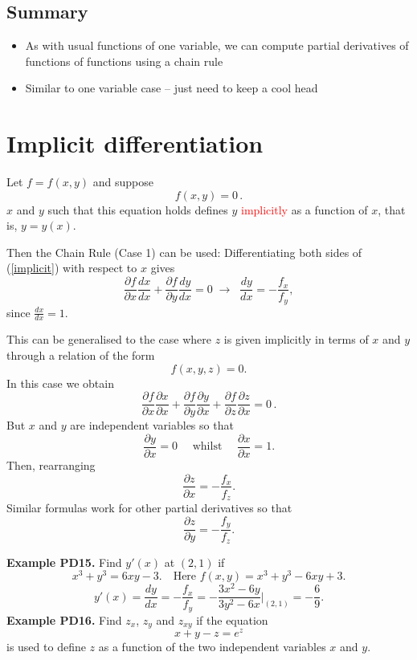 \documentclass{article}
\begin{document}
\subsection{Summary}

\begin{itemize}
\item
As with usual functions of one variable, we can compute partial derivatives of functions of functions using a chain rule
\item
Similar to one variable case -- just need to keep a cool head
\end{itemize}


\section{Implicit differentiation}

Let $f=f(x,y)$ and suppose
\begin{equation}
\label{implicit}
f(x,y)=0\,.
\end{equation}
$x$ and $y$ such that this equation holds defines $y$ \textcolor{red}{implicitly} as a function of $x$, that is, $y=y(x)$.

Then the Chain Rule (Case 1) can be used: Differentiating both sides of (\ref{implicit}) 
with respect to $x$ gives
$$
 \frac{\partial f}{\partial x} \frac{d x}{d x}
+ \frac{\partial f}{\partial y} \frac{d y}{d x}=0 \; \to \;\;
\frac{dy}{dx} = - \frac{f_x}{f_y},
$$
since $\frac{dx}{dx}=1$. 


This can be generalised to the case where $z$ is given implicitly in terms of $x$ and $y$ through a relation of the form 
$$
f(x,y,z)=0.
$$
In this case we obtain
$$
 \frac{\partial f}{\partial x} \frac{\partial x}{\partial x}
+ \frac{\partial f}{\partial y} \frac{\partial y}{\partial x} +
\frac{\partial f}{\partial z} \frac{\partial z}{\partial x}=0\,.
$$
But $x$ and $y$ are independent variables so that
$$
 \frac{\partial y}{\partial x} =0 \quad \mbox{  whilst  } \quad \frac{\partial x}{\partial x}=1.
$$
Then, rearranging
$$
 \frac{\partial z}{\partial x} = - \frac{f_ x}{f_z}.
$$
Similar formulas work for other partial derivatives so that
$$
\frac{\partial z} {\partial y} = - \frac{f_y}{f_z}.
$$



\textbf{Example PD15.} Find $y'(x)$ at $(2,1)$ if 
$$ 
x^3+y^3=6xy-3. \quad \mbox{Here  } f (x,y) = x^3+y^3-6xy+3.
$$
$$
y'(x) = \frac{dy}{dx}=-\frac{f_x}{f_y}= -\frac{ 3x^2-6y}{3y^2-6x}\Big|_{(2,1)} = -\frac{6}{9}.
$$
\textbf{Example PD16.} Find $z_x$, $z_y$ and $z_{xy}$ if the equation
$$
 x+y-z=e^z
$$
is used to define $z$ as a function of the two independent variables $x$ and $y$.
\end{document}
